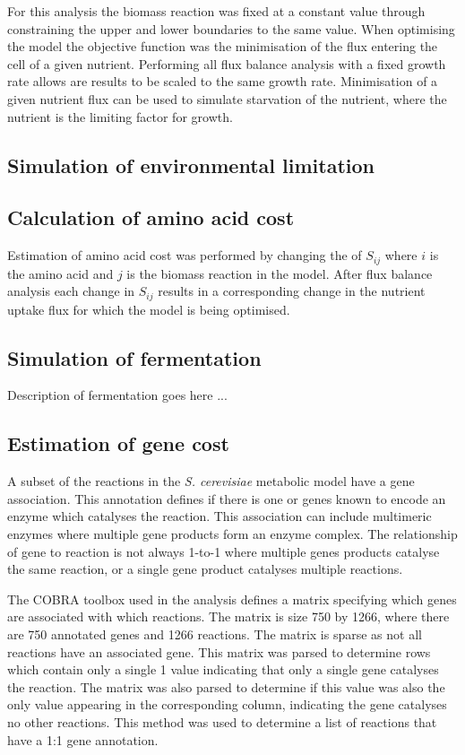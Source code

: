 For this analysis the biomass reaction was fixed at a constant value through constraining the upper and lower boundaries to the same value. When optimising the model the objective function was the minimisation of the flux entering the cell of a given nutrient. Performing all flux balance analysis with a fixed growth rate allows are results to be scaled to the same growth rate. Minimisation of a given nutrient flux can be used to simulate starvation of the nutrient, where the nutrient is the limiting factor for growth.

\subsection{Simulation of environmental limitation}

\subsection{Calculation of amino acid cost}

Estimation of amino acid cost was performed by changing the of $S_{ij}$ where $i$ is the amino acid and $j$ is the biomass reaction in the model. After flux balance analysis each change in $S_{ij}$ results in a corresponding change in the nutrient uptake flux for which the model is being optimised.

\subsection{Simulation of fermentation}

Description of fermentation goes here ...

\subsection{Estimation of gene cost}

A subset of the reactions in the \emph{S. cerevisiae} metabolic model have a gene association. This annotation defines if there is one or genes known to encode an enzyme which catalyses the reaction. This association can include multimeric enzymes where multiple gene products form an enzyme complex. The relationship of gene to reaction is not always 1-to-1 where multiple genes products catalyse the same reaction, or a single gene product catalyses multiple reactions. 

The COBRA toolbox used in the analysis defines a matrix specifying which genes are associated with which reactions. The matrix is size 750 by 1266, where there are 750 annotated genes and 1266 reactions. The matrix is sparse as not all reactions have an associated gene. This matrix was parsed to determine rows which contain only a single 1 value indicating that only a single gene catalyses the reaction. The matrix was also parsed to determine if this value was also the only value appearing in the corresponding column, indicating the gene catalyses no other reactions. This method was used to determine a list of reactions that have a 1:1 gene annotation.


